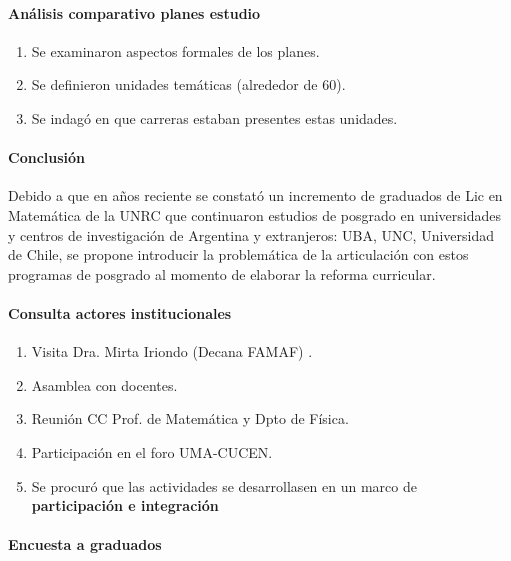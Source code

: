 \documentclass[a4paper,10pt,BCOR10mm,oneside,headsepline]{scrbook}
\begin{document}
\paragraph{ Análisis comparativo planes estudio}
\begin{enumerate} 
  \item Se examinaron aspectos formales de los planes.
 \item Se definieron unidades temáticas (alrededor de 60).
 \item Se indagó en que carreras estaban presentes estas unidades.
\end{enumerate}


\paragraph{Conclusión}
 Debido a que en años reciente se constató un incremento de graduados de Lic en Matemática de la UNRC que continuaron estudios de posgrado en universidades y centros de investigación de Argentina y extranjeros: UBA, UNC, Universidad de Chile, se propone  introducir la problemática de la articulación con estos programas de posgrado  al momento de elaborar la reforma curricular. 







\paragraph{Consulta actores institucionales }



\begin{enumerate} 
  \item Visita Dra. Mirta Iriondo (Decana FAMAF) .
 \item Asamblea con docentes.
 \item Reunión CC Prof. de Matemática y Dpto de Física.
 \item Participación en el foro UMA-CUCEN.
 \item Se procuró que las actividades se desarrollasen en un marco de \textbf{participación e integración}
 \end{enumerate}







\paragraph{Encuesta a graduados}
\end{document}
